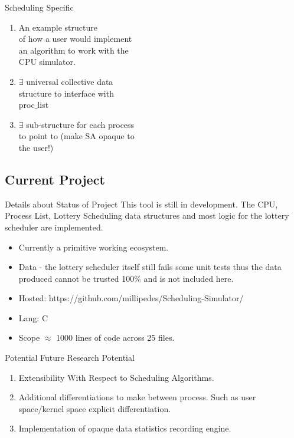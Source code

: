 \documentclass{beamer}
\begin{document}
    \begin{frame}{Scheduling Specific}
      \begin{enumerate}
        \item An example structure \\
          of how a user would implement \\
          an algorithm to work with the \\
          CPU simulator.
        \item  $\exists$ universal collective data \\
          structure to interface with \\
          proc$\_$list
        \item $\exists$ sub-structure for each process \\
          to point to (make SA opaque to \\
          the user!)
      \end{enumerate}
      \begin{textblock*}{2.5cm}(7cm,2.2cm)
        \texttt{[image: \{./figures/ticket\_subsystem.png]}}
      \end{textblock*}
    \end{frame}
  \subsection{Current Project}
    \begin{frame}{Details about Status of Project}
      This tool is still in development. The CPU, Process List, Lottery
      Scheduling data structures and most logic for the lottery scheduler are
      implemented.
      \begin{itemize}
        \item Currently a primitive working ecosystem.
        \item Data - the lottery scheduler itself still fails some unit tests
          thus the data produced cannot be trusted 100$\%$ and is not included
          here.
        \item Hosted: https://github.com/millipedes/Scheduling-Simulator/
        \item Lang: C
        \item Scope $\approx$ 1000 lines of code across 25 files.
      \end{itemize}
    \end{frame}

    \begin{frame}{Potential Future Research Potential}
      \begin{enumerate}
        \item Extensibility With Respect to Scheduling Algorithms.
        \item Additional differentiations to make between process. Such as user
          space/kernel space explicit differentiation.
        \item Implementation of opaque data statistics recording engine.
      \end{enumerate}
    \end{frame}
\end{document}
